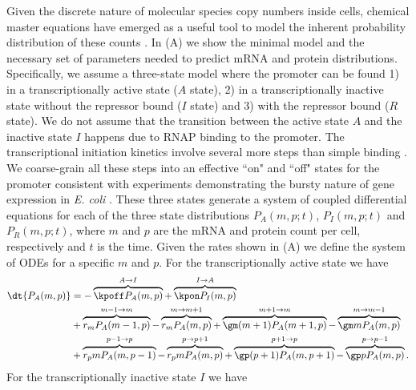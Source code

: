 Given the discrete nature of molecular species copy numbers inside cells,
chemical master equations have emerged as a useful tool to model the inherent
probability distribution of these counts \cite{Sanchez2013}. In
(A) we show the minimal model and the necessary set of
parameters needed to predict mRNA and protein distributions. Specifically, we
assume a three-state model where the promoter can be found 1) in a
transcriptionally active state  ($A$ state), 2) in a transcriptionally inactive
state without the repressor bound ($I$ state) and 3) with the repressor bound
($R$ state). We do not assume that the transition between the active state $A$
and the inactive state $I$ happens due to RNAP binding to the promoter. The
transcriptional initiation kinetics involve several more steps than simple
binding \cite{Browning2004}. We coarse-grain all these steps into an effective
``on" and ``off" states for the promoter consistent with  experiments
demonstrating the bursty nature of gene expression in {\it E. coli}
\cite{Golding2005}. These three states generate a system of coupled differential
equations for each of the three state distributions $P_A(m, p; t)$, $P_I(m, p;
t)$ and $P_R(m, p; t)$, where $m$ and $p$ are the mRNA and protein count per
cell, respectively and $t$ is the time. Given the rates shown in
(A) we define the system of ODEs for a specific $m$ and
$p$. For the transcriptionally active state we have
\begin{equation}
  \begin{aligned}
    \dt{P_A(m, p)} &=
    - \overbrace{\kpoff P_A(m, p)}^{A \rightarrow I} %
    + \overbrace{\kpon P_I(m, p)}^{I \rightarrow A}\\ %
    &+ \overbrace{r_m P_A(m-1, p)}^{m-1 \rightarrow m} %
    - \overbrace{r_m P_A(m, p)}^{m \rightarrow m+1}%
    + \overbrace{\gm (m + 1) P_A(m+1 , p)}^{m+1 \rightarrow m} %
    - \overbrace{\gm m P_A(m , p)}^{m \rightarrow m-1}\\ %
    &+ \overbrace{r_p m P_A(m, p - 1)}^{p-1 \rightarrow p} %
    - \overbrace{r_p m P_A(m, p)}^{p \rightarrow p+1} %
    + \overbrace{\gp (p + 1) P_A(m, p + 1)}^{p + 1 \rightarrow p} %
    - \overbrace{\gp p P_A(m, p)}^{p \rightarrow p-1}. %
  \end{aligned}
\end{equation}
For the transcriptionally inactive state $I$ we have

